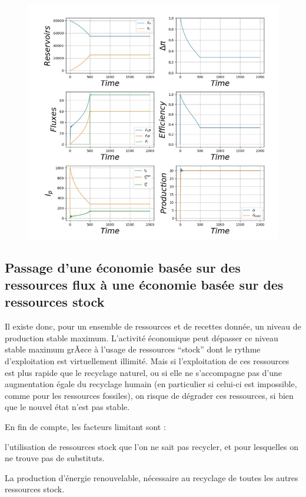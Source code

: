 \documentclass[12pt,a4paper]{article}%
\begin{document}
\begin{figure}[h]
\centering
\includegraphics[width=1.0\textwidth]{figures/Tableau-Bord10.jpg}\label{Fig10}\end{figure}

\subsection{Passage d'une économie basée sur des ressources flux à une
économie basée sur des ressources stock}

Il existe donc, pour un ensemble de ressources et de recettes donnée, un
niveau de production stable maximum. L'activité économique peut dépasser ce
niveau stable maximum grÃ¢ce à l'usage de ressources "`stock"' dont le
rythme d'exploitation est virtuellement illimité. Mais si l'exploitation de
ces ressources est plus rapide que le recyclage naturel, ou si elle ne
s'accompagne pas d'une augmentation égale du recyclage humain (en particulier
si celui-ci est impossible, comme pour les ressources fossiles), on risque de
dégrader ces ressources, si bien que le nouvel état n'est pas stable.

En fin de compte, les facteurs limitant sont :

\textbullet\qquad l'utilisation de ressources stock que l'on ne sait pas
recycler, et pour lesquelles on ne trouve pas de substituts.

\textbullet\qquad La production d'énergie renouvelable, nécessaire au
recyclage de toutes les autres ressources stock.
\end{document}
